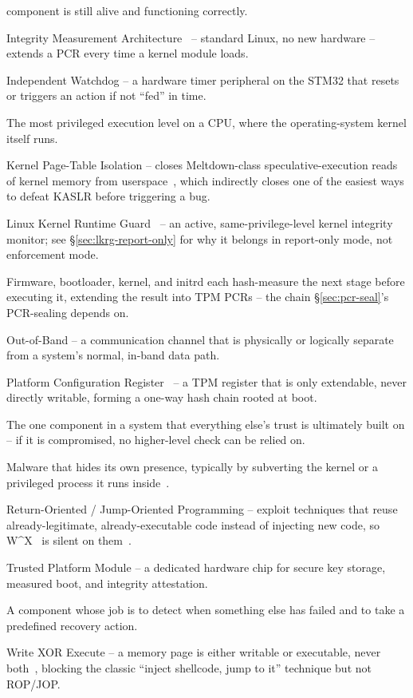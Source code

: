 \documentclass[11pt,a4paper]{article}
\begin{document}
\begin{description}[leftmargin=3.2cm, style=nextline, itemsep=0.35em]
    component is still alive and functioning correctly.
  \item[IMA] Integrity Measurement Architecture~\cite{sailer2004,kernelima}
    -- standard Linux, no new hardware -- extends a PCR every time a
    kernel module loads.
  \item[IWDG] Independent Watchdog -- a hardware timer peripheral on the
    STM32 that resets or triggers an action if not ``fed'' in time.
  \item[Kernel Ring 0] The most privileged execution level on a CPU,
    where the operating-system kernel itself runs.
  \item[KPTI] Kernel Page-Table Isolation -- closes Meltdown-class
    speculative-execution reads of kernel memory from
    userspace~\cite{lipp2018}, which indirectly closes one of the
    easiest ways to defeat KASLR before triggering a bug.
  \item[LKRG] Linux Kernel Runtime Guard~\cite{lkrg} -- an active,
    same-privilege-level kernel integrity monitor; see
    \S\ref{sec:lkrg-report-only} for why it belongs in report-only
    mode, not enforcement mode.
  \item[Measured Boot] Firmware, bootloader, kernel, and initrd each
    hash-measure the next stage before executing it, extending the
    result into TPM PCRs -- the chain \S\ref{sec:pcr-seal}'s
    PCR-sealing depends on.
  \item[OOB] Out-of-Band -- a communication channel that is physically
    or logically separate from a system's normal, in-band data path.
  \item[PCR] Platform Configuration Register~\cite{tcgtpm2,tcgpcclient}
    -- a TPM register that is only extendable, never directly
    writable, forming a one-way hash chain rooted at boot.
  \item[Root of Trust] The one component in a system that everything
    else's trust is ultimately built on -- if it is compromised, no
    higher-level check can be relied on.
  \item[Rootkit] Malware that hides its own presence, typically by
    subverting the kernel or a privileged process it runs
    inside~\cite{hogland2005}.
  \item[ROP/JOP] Return-Oriented / Jump-Oriented Programming -- exploit
    techniques that reuse already-legitimate, already-executable code
    instead of injecting new code, so
    W\textasciicircum X~\cite{deraadt2005} is silent on
    them~\cite{shacham2007,bletsch2011}.
  \item[TPM] Trusted Platform Module -- a dedicated hardware chip for
    secure key storage, measured boot, and integrity attestation.
  \item[Watchdog] A component whose job is to detect when something else
    has failed and to take a predefined recovery action.
  \item[W\textasciicircum X] Write XOR Execute -- a memory page is
    either writable or executable, never
    both~\cite{deraadt2005}, blocking the classic ``inject
    shellcode, jump to it'' technique but not ROP/JOP.
\end{description}
\end{document}
